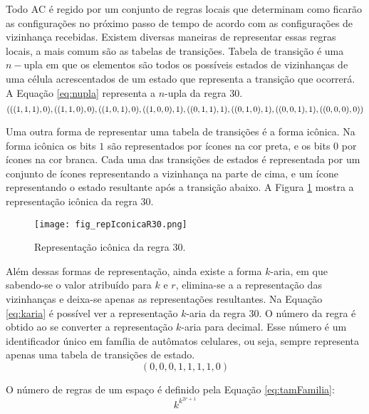 Todo AC é regido por um conjunto de regras locais que determinam como ficarão as configurações no próximo passo de tempo de acordo com as configurações de vizinhança recebidas. Existem diversas maneiras de representar essas regras locais, a mais comum são as tabelas de transições. Tabela de transição é uma $n-$upla em que os elementos são todos os possíveis estados de vizinhanças de uma célula acrescentados de um estado que representa a transição que ocorrerá. A Equação \ref{eq:nupla} representa a $n$-upla da regra 30.
\begin{equation}
(((1,1,1),0),((1,1,0),0),((1,0,1),0),((1,0,0),1),\\
((0,1,1),1),((0,1,0),1),((0,0,1),1),((0,0,0),0))
\label{eq:nupla}
\end{equation}

Uma outra forma de representar uma tabela de transições é a forma icônica. Na forma icônica os bits $1$ são representados por ícones na cor preta, e os bits $0$ por ícones na cor branca. Cada uma das transições de estados é representada por um conjunto de ícones representando a vizinhança na parte de cima, e um ícone representando o estado resultante após a transição abaixo. A Figura \ref{fig:repIconicaR30} mostra a representação icônica da regra 30.

	\begin{figure}[h!]
	  \centering
	  \texttt{[image: fig\_repIconicaR30.png]}
	  \caption{Representação icônica da regra 30.}
	  \label{fig:repIconicaR30}
	\end{figure}

Além dessas formas de representação, ainda existe a forma $k$-aria, em que sabendo-se o valor atribuído para $k$ e $r$, elimina-se a a representação das vizinhanças e deixa-se apenas as representações resultantes. Na Equação \ref{eq:karia} é possível ver a representação $k$-aria da regra 30. O número da regra é obtido ao se converter a representação $k$-aria para decimal. Esse número é um identificador único em família de autômatos celulares, ou seja, sempre representa apenas uma tabela de transições de estado.
\begin{equation}
(0,0,0,1,1,1,1,0)
\label{eq:karia}
\end{equation}

O número de regras de um espaço é definido pela Equação \ref{eq:tamFamilia}:
\begin{equation}
k^{k^{2r+1}}
\label{eq:tamFamilia}
\end{equation}

